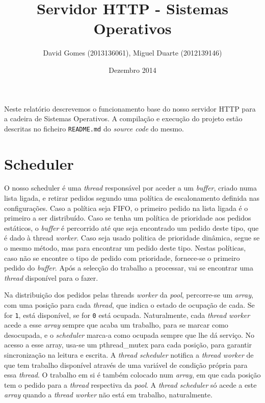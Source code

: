 \documentclass[12pt]{article}
\title{Servidor HTTP - Sistemas Operativos}
\author{David Gomes (2013136061), Miguel Duarte (2012139146)}
\date{Dezembro 2014}
\begin{document}
\maketitle

Neste relatório descrevemos o funcionamento base do nosso servidor HTTP
para a cadeira de Sistemas Operativos. A compilação e execução do projeto
estão descritas no ficheiro \texttt{README.md} do \textit{source code} do
mesmo.

\section{Scheduler}
O nosso scheduler é uma \textit{thread} responsável por aceder a um \textit{buffer}, criado numa lista ligada, e retirar pedidos segundo uma política de escalonamento definida nas configurações. Caso a política seja FIFO, o primeiro pedido na lista ligada é o primeiro a ser distribuído. Caso se tenha um política de prioridade aos pedidos estáticos, o \textit{buffer} é percorrido até que seja encontrado um pedido deste tipo, que é dado à thread \textit{worker}. Caso seja usado politica de prioridade dinâmica, segue se o mesmo método, mas para encontrar um pedido deste tipo. Nestas políticas, caso não se encontre o tipo de pedido com prioridade, fornece-se o primeiro pedido do \textit{buffer}. Após a selecção do trabalho a processar, vai se encontrar uma \textit{thread} disponível para o fazer.

Na distribuição dos pedidos pelas threads \textit{worker} da \textit{pool}, percorre-se um \textit{array}, com uma posição para cada \textit{thread}, que indica o estado de ocupação de cada. Se for \texttt{1}, está disponível, se for \texttt{0} está ocupada. Naturalmente, cada \textit{thread worker} acede a esse \textit{array} sempre que acaba um trabalho, para se marcar como desocupada, e o \textit{scheduler} marca-a como ocupada sempre que lhe dá serviço. No acesso a esse array, usa-se um pthread\_mutex para cada posição, para garantir sincronização na leitura e escrita. A \textit{thread scheduler} notifica a \textit{thread worker} de que tem trabalho disponível através de uma variável de condição própria para essa \textit{thread}. O trabalho em si é também colocado num \textit{array}, em que cada posição tem o pedido para a \textit{thread} respectiva da \textit{pool}. A \textit{thread scheduler} só acede a este \textit{array} quando a \textit{thread worker} não está em trabalho, naturalmente.

\pagebreak
\end{document}
